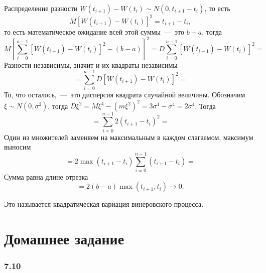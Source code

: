 Распределение разности
$W \left( t_{i + 1} \right) - W \left( t_i \right) \sim
  N \left( 0, t_{i + 1} - t_i \right) $,
то есть
\begin{equation*}
  M \left[ W \left( t_{i + 1} \right) - W \left( t_i \right) \right]^2 =
  t_{i + 1} - t_i,
\end{equation*}
то есть математическое ожидание всей этой суммы~---~это $b - a$, тогда
\begin{equation*}
  M \left[
    \sum \limits_{i = 0}^{n - 1}
      \left[ W \left( t_{i + 1} \right) - W \left( t_i \right) \right]^2 -
    \left( b - a \right) \right]^2 =
  D \sum \limits_{i = 0}^{n - 1}
    \left[ W \left( t_{i + 1} \right) - W \left( t_i \right) \right]^2 =
\end{equation*}
Разности независимы, значит и их квадраты независимы
\begin{equation*}
  = \sum \limits_{i = 0}^{n - 1}
    D \left[ W \left( t_{i + 1} \right) - W \left( t_i \right) \right]^2 =
\end{equation*}
То, что осталось,~---~это дисперсия квадрата случайной величины.
Обозначим $ \xi \sim N \left( 0, \sigma^2 \right) $,
тогда $D \xi^2 = M \xi^4 - \left( m \xi^2 \right)^2 = 3 \sigma^4 - \sigma^4 = 2 \sigma^4$.
Тогда
\begin{equation*}
= \sum \limits_{i = 0}^{n - 1} 2 \left( t_{i + 1} - t_i \right)^2 =
\end{equation*}
Один из множителей заменяем на максимальным в каждом слагаемом, максимум выносим
\begin{equation*}
  = 2 \max \left( t_{i + 1} - t_i \right)
  \sum \limits_{i = 0}^{n - 1} \left( t_{i + 1} - t_i \right) =
\end{equation*}
Сумма равна длине отрезка
\begin{equation*}
  = 2 \left( b - a \right) \max \left( t_{i + 1}, t_i \right) \to
  0.
\end{equation*}

Это называется квадратическая вариация винеровского процесса.

\section*{Домашнее задание}

\subsubsection*{7.10}

